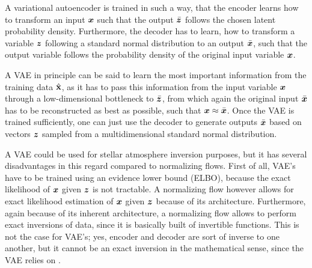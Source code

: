 \documentclass[a4paper,12pt]{report}
\def\lk#1{{\color{black}{#1}}}
\begin{document}
A variational autoencoder is trained in such a way, that the encoder learns how to transform an input $\bm{x}$ such that the output $\bar{\bm{z}}$ follows the chosen latent probability density. Furthermore, the decoder has to learn, how to transform a variable $\bm{z}$ following a standard normal distribution to an output $\bar{\bm{x}}$, such that the output variable follows the probability density of the original input variable $\bm{x}$.

A VAE in principle can be said to learn the most important information from the training data $\hat{\boldsymbol{\mathbf{x}}}$, as it has to pass this information from the input variable $\bm{x}$ through a low-dimensional bottleneck to $\bar{\bm{z}}$, from which again the original input $\bar{\bm{x}}$ has to be reconstructed as best as possible, such that $\bm{x} \approx \bar{\bm{x}}$. Once the VAE is trained sufficiently, one can just use the decoder to generate outputs $\bar{\bm{x}}$ based on vectors $\bm{z}$ sampled from a multidimensional standard normal distribution.

A VAE could be used for stellar atmosphere inversion purposes, but it has several disadvantages in this regard compared to normalizing flows. First of all, VAE's have to be trained using an evidence lower bound (ELBO), because the exact likelihood of $\bm{x}$ given $\bm{z}$ is not tractable. A normalizing flow however allows for exact likelihood estimation of $\bm{x}$ given $\bm{z}$ because of its architecture. Furthermore, again because of its inherent architecture, a normalizing flow allows to perform exact inversions of data, since it is basically built of invertible functions. This is not the case for VAE's; yes, encoder and decoder are sort of inverse to one another, but it cannot be an exact inversion in the mathematical sense, since the VAE relies on \lk{dimensionality reduction}.
\end{document}
